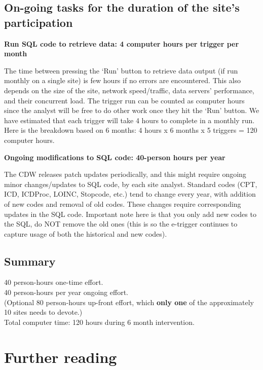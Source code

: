 \documentclass{article}
\begin{document}
\subsection{On-going tasks for the duration of the site's participation}

\noindent\textbf{Run SQL code to retrieve data: 4 computer hours per
  trigger per month}

The time between pressing the `Run' button to retrieve data output (if
run monthly on a single site) is few hours if no errors are
encountered. This also depends on the size of the site, network
speed/traffic, data servers' performance, and their concurrent load.
The trigger run can be counted as computer hours since the analyst
will be free to do other work once they hit the `Run' button. We have
estimated that each trigger will take 4 hours to complete in a monthly
run. Here is the breakdown based on 6 months: 4 hours x 6
months x 5 triggers = 120 computer hours.

\noindent\textbf{Ongoing modifications to SQL code: 40-person hours
  per year}

The CDW releases patch updates periodically, and this might require
ongoing minor changes/updates to SQL code, by each site analyst.
Standard codes (CPT, ICD, ICDProc, LOINC, Stopcode, etc.) tend to
change every year, with addition of new codes and removal of old
codes. These changes require corresponding updates in the SQL code.
Important note here is that you only add new codes to the SQL, do NOT
remove the old ones (this is so the e-trigger continues to capture
usage of both the historical and new codes).

\subsection{Summary}

40 person-hours one-time effort.\\
40 person-hours per year ongoing effort.\\
(Optional 80 person-hours up-front effort, which \textbf{only one} of
the approximately 10 sites needs to devote.)\\
Total computer time: 120 hours during 6 month intervention.




\section{Further reading}
\end{document}
